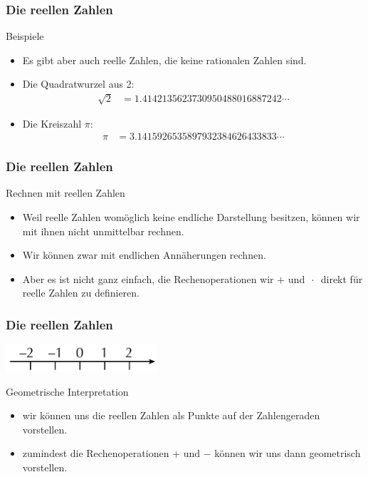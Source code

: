 \documentclass{beamer}
\renewcommand{\ae}{\"a}
\renewcommand{\oe}{\"o}
\newcommand{\ue}{\"u}
\newcommand{\mytitle}{Die reellen Zahlen}
\begin{document}
\begin{frame}\frametitle{\mytitle}
	\begin{block}{Beispiele}
	\begin{itemize}
		\item Es gibt aber auch reelle Zahlen, die keine rationalen Zahlen sind.
		\item Die Quadratwurzel aus 2:
			\begin{align*}
				\sqrt 2&=1.4142135623730950488016887242\cdots
			\end{align*}
		\item Die Kreiszahl $\pi$:
			\begin{align*}
				\pi&=3.1415926535897932384626433833\cdots
			\end{align*}
	\end{itemize}
	\end{block}
\end{frame}

\begin{frame}\frametitle{\mytitle}
	\begin{block}{Rechnen mit reellen Zahlen}
	\begin{itemize}
		\item Weil reelle Zahlen wom\oe glich keine endliche Darstellung besitzen, k\oe nnen wir mit ihnen nicht unmittelbar rechnen.
		\item Wir k\oe nnen zwar mit endlichen Ann\ae herungen rechnen.
		\item Aber es ist nicht ganz einfach, die Rechenoperationen wir $+$ und $\,\cdot\,$ direkt f\ue r reelle Zahlen zu definieren.
	\end{itemize}
	\end{block}
\end{frame}

\begin{frame}\frametitle{\mytitle}
	\hfill\includegraphics[height=10mm]{pics/integers.pdf}
	\begin{block}{Geometrische Interpretation}
	\begin{itemize}
		\item wir k\oe nnen uns die reellen Zahlen als Punkte auf der Zahlengeraden vorstellen.
		\item zumindest die Rechenoperationen $+$ und $-$ k\oe nnen wir uns dann geometrisch vorstellen.
	\end{itemize}
	\end{block}
\end{frame}
\end{document}
